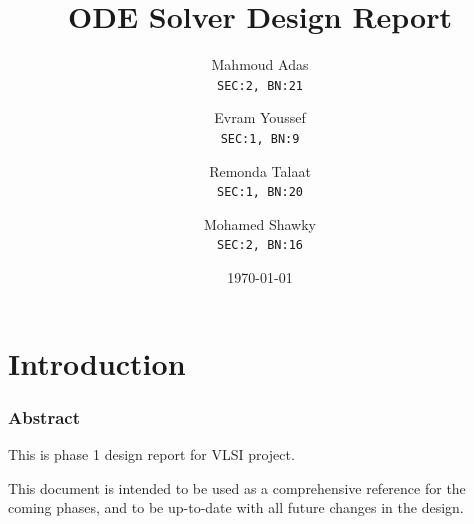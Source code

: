 \documentclass[12pt]{report}
\title{\LARGE{ODE Solver Design Report}}
\author{
  Mahmoud Adas\\
  \small\texttt{SEC:2, BN:21}
  \and
  Evram Youssef\\
  \small\texttt{SEC:1, BN:9}
  \and
  Remonda Talaat\\
  \small\texttt{SEC:1, BN:20}
  \and
  Mohamed Shawky\\
  \small\texttt{SEC:2, BN:16}
}
\date{\today}
\begin{document}
\thispagestyle{empty}

\maketitle
\tableofcontents
\listoffigures
\listoftables
\clearpage


\part{Introduction}
\section{Abstract}
This is phase 1 design report for VLSI project. 

This document is intended to be used as a comprehensive reference for the coming phases, and to be up-to-date with all future changes in the design.
\end{document}

